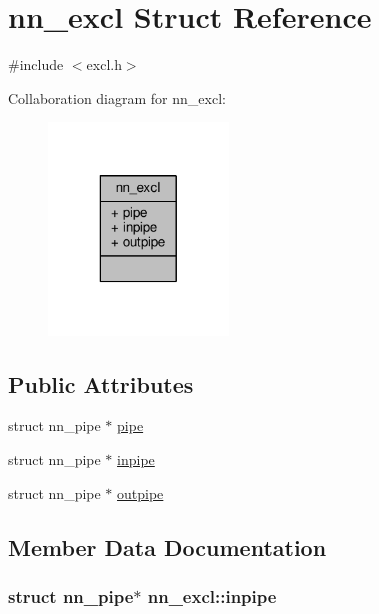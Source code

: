 \hypertarget{structnn__excl}{}\section{nn\+\_\+excl Struct Reference}
\label{structnn__excl}


{\ttfamily \#include $<$excl.\+h$>$}



Collaboration diagram for nn\+\_\+excl\+:\nopagebreak
\begin{figure}[H]
\begin{center}
\leavevmode
\includegraphics[width=136pt]{structnn__excl__coll__graph}
\end{center}
\end{figure}
\subsection*{Public Attributes}
\begin{DoxyCompactItemize}
\item 
struct nn\+\_\+pipe $\ast$ \hyperlink{structnn__excl_a94b5ea848971e08ed35baed15aea5ee9}{pipe}
\item 
struct nn\+\_\+pipe $\ast$ \hyperlink{structnn__excl_ac2da1ab40e0450e1311a80e28285e310}{inpipe}
\item 
struct nn\+\_\+pipe $\ast$ \hyperlink{structnn__excl_a28f7fc280d63150d45dce48ff58f738d}{outpipe}
\end{DoxyCompactItemize}


\subsection{Member Data Documentation}
\subsubsection[{inpipe}]{\setlength{\rightskip}{0pt plus 5cm}struct nn\+\_\+pipe$\ast$ nn\+\_\+excl\+::inpipe}\hypertarget{structnn__excl_ac2da1ab40e0450e1311a80e28285e310}{}\label{structnn__excl_ac2da1ab40e0450e1311a80e28285e310}
